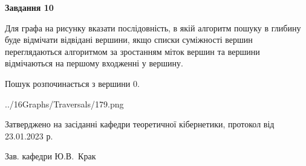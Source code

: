 \documentclass[12pt, ukrainian]{article}
\begin{document}
{\begin {large}
{\begin {center}\textbf{Завдання 10}\end {center}}\par
Для графа на рисунку вказати послідовність, в якій алгоритм пошуку в глибину буде відмічати відвідані вершини, якщо списки суміжності вершин переглядаються алгоритмом за зростанням міток вершин та вершини відмічаються на першому вход\-женні у вершину.\par
Пошук розпочинається з вершини 0.\par

\begin{center}
	{../16Graphs/Traversals/179.png}
\end{center}\par
\newpage


\end {large}
}
{\smallskip \begin {small} Затверджено на засіданні кафедри теоретичної кібернетики, протокол  від   23.01.2023 р.\par\smallskip\smallskip
{\parbox {6.5 cm}{Зав. кафедри \dotfill Ю.В.~Крак}} \end{small}}
\end{document}
